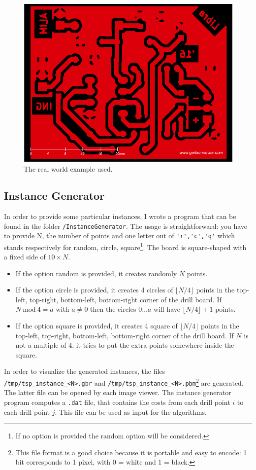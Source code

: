 \begin{figure}[ht!]
	\centering
	\includegraphics[scale=0.3]{img/real_world.png}
	\caption{The real world example used.}
	\label{figure:pbc}
\end{figure}

\subsection{Instance Generator}
\label{sec:instance:generator}
In order to provide some particular instances, I wrote a program that can be found in the folder
\verb|/InstanceGenerator|. The usage is straightforward: you have to provide N, the number of points and
one letter out of \verb|'r','c','q'| which stands respectively for random, circle, square\footnote{If no option is provided the random option will be considered.}. The board is square-shaped with a fixed side of $10\times N$.
\begin{itemize}
	\item If the option random is provided, it creates randomly $N$ points.
	\item If the option circle is provided, it creates 4 circles of $\lfloor{N/4}\rfloor$ points in the top-left, top-right, bottom-left, bottom-right corner
	of the drill board. If $N\ \text{mod} \ 4 = a$ with $a \neq 0$ then the circles $0\dots a$ will have $\lfloor{N/4}\rfloor + 1$ points.
	\item If the option square is provided, it creates 4 square of $\lfloor{N/4}\rfloor$ points in the top-left, top-right, bottom-left,
	bottom-right corner of the drill board. If $N$ is not a multiple of $4$, it tries to put the extra points somewhere inside the square.
\end{itemize}
In order to visualize the generated instances, the files
\verb!/tmp/tsp_instance_<N>.gbr! and \verb!/tmp/tsp_instance_<N>.pbm!\footnote{This file format is a good choice because it is
portable and easy to encode: 1 bit corresponds to 1 pixel, with 0 = white and 1 = black.} are generated.
The latter file can be opened by each image viewer.
The instance generator program computes a \verb|.dat| file, that contains the costs from each drill point $i$ to each drill point $j$. This file can be used as input for the algorithms.

